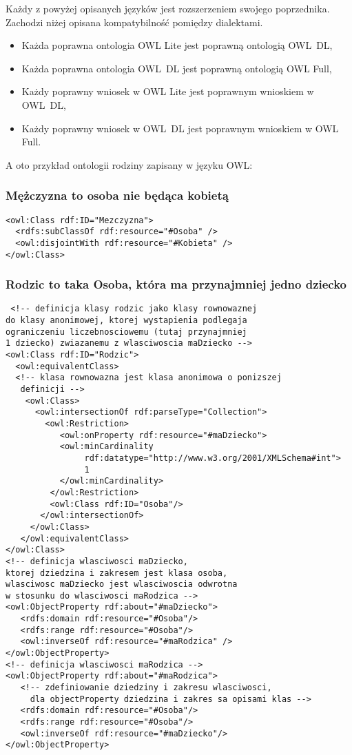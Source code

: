 Każdy z powyżej opisanych języków jest rozszerzeniem swojego poprzednika. Zachodzi niżej opisana kompatybilność pomiędzy dialektami. 
\begin{itemize}
 \item  Każda poprawna ontologia OWL Lite jest poprawną ontologią OWL~DL,
 \item  Każda poprawna ontologia OWL~DL jest poprawną ontologią OWL Full,
 \item  Każdy poprawny wniosek w OWL Lite jest poprawnym wnioskiem w OWL~DL,
 \item  Każdy poprawny wniosek w OWL~DL jest poprawnym wnioskiem w OWL Full.
\end{itemize}


A oto przykład ontologii rodziny zapisany w języku OWL\cite{jankowski}: 

\subsubsection*{Mężczyzna to osoba nie będąca kobietą}
\begin{verbatim}
<owl:Class rdf:ID="Mezczyzna">
  <rdfs:subClassOf rdf:resource="#Osoba" />
  <owl:disjointWith rdf:resource="#Kobieta" />
</owl:Class>
\end{verbatim}

\subsubsection*{Rodzic to taka Osoba, która ma przynajmniej jedno dziecko}
\begin{verbatim}
 <!-- definicja klasy rodzic jako klasy rownowaznej
do klasy anonimowej, ktorej wystapienia podlegaja
ograniczeniu liczebnosciowemu (tutaj przynajmniej
1 dziecko) zwiazanemu z wlasciwoscia maDziecko -->
<owl:Class rdf:ID="Rodzic">
  <owl:equivalentClass>
  <!-- klasa rownowazna jest klasa anonimowa o ponizszej
   definicji -->
    <owl:Class>
      <owl:intersectionOf rdf:parseType="Collection">
        <owl:Restriction>
           <owl:onProperty rdf:resource="#maDziecko">
           <owl:minCardinality
                rdf:datatype="http://www.w3.org/2001/XMLSchema#int">
                1
           </owl:minCardinality>
         </owl:Restriction>
         <owl:Class rdf:ID="Osoba"/>
       </owl:intersectionOf>
     </owl:Class>
   </owl:equivalentClass>
</owl:Class>
<!-- definicja wlasciwosci maDziecko,
ktorej dziedzina i zakresem jest klasa osoba,
wlasciwosc maDziecko jest wlasciwoscia odwrotna
w stosunku do wlasciwosci maRodzica -->
<owl:ObjectProperty rdf:about="#maDziecko">
   <rdfs:domain rdf:resource="#Osoba"/>
   <rdfs:range rdf:resource="#Osoba"/>
   <owl:inverseOf rdf:resource="#maRodzica" />
</owl:ObjectProperty>
<!-- definicja wlasciwosci maRodzica -->
<owl:ObjectProperty rdf:about="#maRodzica">
   <!-- zdefiniowanie dziedziny i zakresu wlasciwosci,
     dla objectProperty dziedzina i zakres sa opisami klas -->
   <rdfs:domain rdf:resource="#Osoba"/>
   <rdfs:range rdf:resource="#Osoba"/>
   <owl:inverseOf rdf:resource="#maDziecko"/>
</owl:ObjectProperty>

\end{verbatim}



